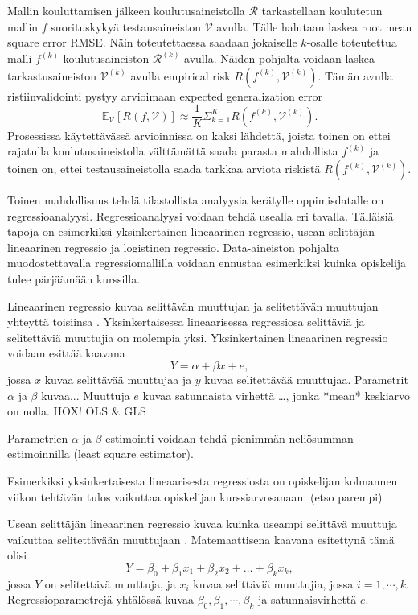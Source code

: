 Mallin kouluttamisen jälkeen koulutusaineistolla $\mathcal{R}$ tarkastellaan koulutetun mallin $f$ suorituskykyä testausaineiston $\mathcal{V}$ avulla. Tälle halutaan laskea root mean square error RMSE. Näin toteutettaessa saadaan jokaiselle $k$-osalle toteutettua malli $f^{(k)}$ koulutusaineiston $\mathcal{R}^{(k)}$ avulla. Näiden pohjalta voidaan laskea tarkastusaineiston $\mathcal{V}^{(k)}$ avulla empirical risk $R(f^{(k)}, \mathcal{V}^{(k)})$. Tämän avulla ristiinvalidointi pystyy arvioimaan expected generalization error $$\mathds{E}_{\mathcal{V}}[R(f,\mathcal{V})] \approx \frac{1}{K}\Sigma^{K}_{k=1} R(f^{(k)}, \mathcal{V}^{(k)}).$$ Prosessissa käytettävässä arvioinnissa on kaksi lähdettä, joista toinen on ettei rajatulla koulutusaineistolla välttämättä saada parasta mahdollista $f^{(k)}$ ja toinen on, ettei testausaineistolla saada tarkkaa arviota riskistä $R(f^{(k)}, \mathcal{V}^{(k)})$.
\color{black}




\color{red}

Toinen mahdollisuus tehdä tilastollista analyysia kerätylle oppimisdatalle on regressioanalyysi. Regressioanalyysi voidaan tehdä usealla eri tavalla. Tälläisiä tapoja on esimerkiksi yksinkertainen lineaarinen regressio, usean selittäjän lineaarinen regressio ja logistinen regressio. Data-aineiston pohjalta muodostettavalla regressiomallilla voidaan ennustaa esimerkiksi kuinka opiskelija tulee pärjäämään kurssilla.

Lineaarinen regressio kuvaa selittävän muuttujan ja selitettävän muuttujan yhteyttä toisiinsa \cite{rossIntroductoryStatistics2017}. Yksinkertaisessa lineaarisessa regressiosa selittäviä ja selitettäviä muuttujia on molempia yksi. Yksinkertainen lineaarinen regressio voidaan esittää kaavana $$Y = \alpha + \beta x + e,$$ jossa $x$ kuvaa selittävää muuttujaa ja $y$ kuvaa selitettävää muuttujaa. Parametrit $\alpha$ ja $\beta$ kuvaa... Muuttuja $e$ kuvaa satunnaista virhettä \dots, jonka *mean* keskiarvo on nolla. HOX! OLS \& GLS

Parametrien $\alpha$ ja $\beta$ estimointi voidaan tehdä pienimmän neliösumman estimoinnilla (least square estimator).

Esimerkiksi yksinkertaisesta lineaarisesta regressiosta on opiskelijan kolmannen viikon tehtävän tulos vaikuttaa opiskelijan kurssiarvosanaan. (etso parempi)



Usean selittäjän lineaarinen regressio kuvaa kuinka useampi selittävä muuttuja vaikuttaa selitettävään muuttujaan \cite{rossIntroductoryStatistics2017}. Matemaattisena kaavana esitettynä tämä olisi $$Y = \beta_0 + \beta_1x_1 + \beta_2x_2 + \ldots + \beta_kx_k,$$ jossa $Y$ on selitettävä muuttuja, ja $x_i$ kuvaa selittäviä muuttujia, jossa $i = 1, \cdots, k$. Regressioparametrejä yhtälössä kuvaa $\beta_0, \beta_1, \cdots, \beta_k$ ja satunnaisvirhettä $e$.

